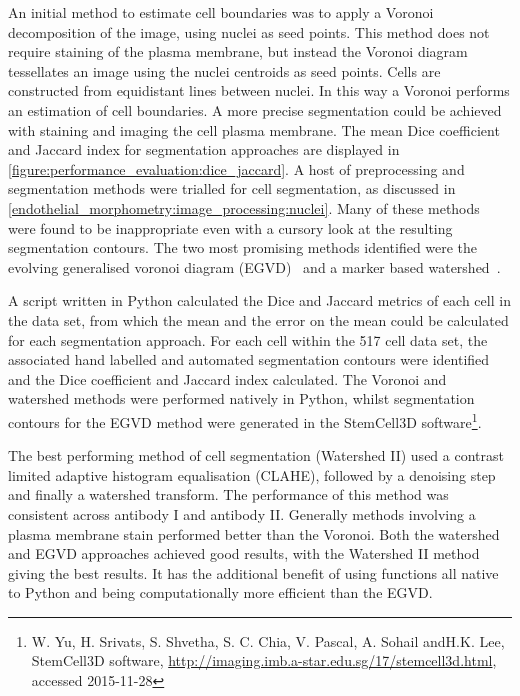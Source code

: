 An initial method to estimate cell boundaries was to apply a Voronoi decomposition of the image, using  nuclei as seed points. This method does not require staining of the plasma membrane, but instead the Voronoi diagram tessellates an image using the nuclei centroids as seed points. Cells are constructed from equidistant lines between nuclei. In this way a Voronoi performs an estimation of cell boundaries. A more precise segmentation could be achieved with staining and imaging the cell plasma membrane. The mean Dice coefficient and Jaccard index for segmentation approaches are displayed in \autoref{figure:performance_evaluation:dice_jaccard}. A host of preprocessing and segmentation methods were trialled for cell segmentation, as discussed in \autoref{endothelial_morphometry:image_processing:nuclei}. Many of these methods were found to be inappropriate even with a cursory look at the resulting segmentation contours. The two most promising methods identified were the evolving generalised voronoi diagram (EGVD)~\cite{Yu2010} and a marker based watershed~\cite{Roerdink2000}.

A script written in Python calculated the Dice and Jaccard metrics of each cell in the data set, from which the mean and the error on the mean could be calculated for each segmentation approach. For each cell within the 517 cell data set, the associated hand labelled and automated segmentation contours were identified and the Dice coefficient and Jaccard index calculated. The Voronoi and watershed methods were performed natively in Python, whilst segmentation contours for the EGVD method  were generated in the StemCell3D software\footnote{W. Yu, H. Srivats, S. Shvetha, S. C. Chia, V. Pascal, A. Sohail andH.K. Lee, StemCell3D software, \url{http://imaging.imb.a-star.edu.sg/17/stemcell3d.html}, accessed 2015-11-28}.

The best performing method of cell segmentation (Watershed II) used a contrast limited adaptive histogram equalisation (CLAHE), followed by a denoising step and finally a watershed transform. The performance of this method was consistent across antibody I and antibody II. Generally methods involving a plasma membrane stain performed better than the Voronoi. Both the watershed and EGVD approaches achieved good results, with the Watershed II method giving the best results. It has the additional benefit of using functions all native to Python and being computationally more efficient than the EGVD.


